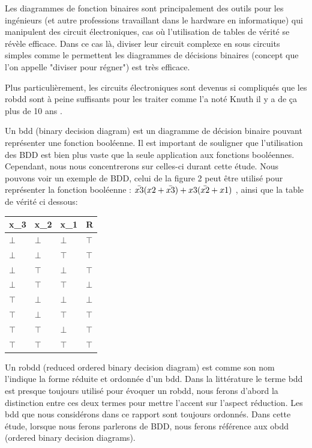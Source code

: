 \documentclass[french]{article}
\begin{document}
Les diagrammes de fonction binaires sont principalement des outils pour les ingénieurs (et autre professions travaillant dans le hardware en informatique) qui manipulent des circuit électroniques, cas où l'utilisation de tables de vérité se révèle efficace. Dans ce cas là, diviser leur circuit complexe en sous circuits simples comme le permettent les diagrammes de décisions binaires (concept que l'on appelle "diviser pour régner") est très efficace.\medskip

Plus particulièrement, les circuits électroniques sont devenus si compliqués que les robdd sont à peine suffisants pour les traiter comme l'a noté Knuth il y a de ça plus de 10 ans \cite{knuth}. \medskip

Un bdd (binary decision diagram) est un diagramme de décision binaire pouvant représenter une fonction booléenne. Il est important de souligner que l'utilisation des BDD est bien plus vaste que la seule application aux fonctions booléennes. Cependant, nous nous concentrerons sur celles-ci durant cette étude. Nous pouvons voir un exemple de BDD, celui de la figure 2 peut être utilisé pour représenter la fonction booléenne : \(\Bar{x3}(x2+\Bar{x3})+x3(\Bar{x2}+x1)\) , ainsi que la table de vérité ci dessous:
\vspace{5mm} 

\begin{tabular}{llll}
  \hline
  x_3 & x_2 & x_1 & R \\
 \hline
  $\bot$ & $\bot$ & $\bot$ & $\top$ \\
  $\bot$ & $\bot$ & $\top$ & $\top$ \\
  $\bot$ & $\top$ & $\bot$ & $\top$ \\
  $\bot$ & $\top$ & $\top$ & $\bot$ \\
  $\top$ & $\bot$ & $\bot$ & $\bot$ \\
  $\top$ & $\bot$ & $\top$ & $\top$ \\
  $\top$ & $\top$ & $\bot$ & $\top$ \\
  $\top$ & $\top$ & $\top$ & $\top$ \\
  \hline
\end{tabular}
\vspace{5mm} 

Un robdd (reduced ordered binary decision diagram) est comme son nom l'indique la forme réduite et ordonnée d'un bdd. Dans la littérature le terme bdd est presque toujours utilisé pour évoquer un robdd, nous ferons d'abord la distinction entre ces deux termes pour mettre l'accent sur l'aspect réduction. Les bdd que nous considérons dans ce rapport sont toujours ordonnés. Dans cette étude, lorsque nous ferons parlerons de BDD, nous ferons référence aux obdd  (ordered binary decision diagrams).\medskip
\end{document}
